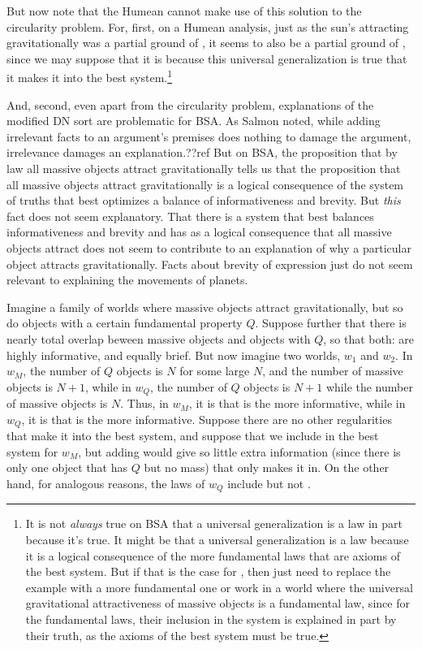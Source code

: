 But now note that the Humean cannot make use of this solution to the circularity problem. For, first, on a Humean analysis, just as 
the sun's attracting gravitationally was a partial ground of , it seems to also be a partial ground of , 
since we may suppose that it is because this universal generalization is true that it makes it into the best 
system.\footnote{It is not \textit{always} true on BSA that a universal generalization is a law in part because it's true. 
It might be that a universal generalization is a law because it is a logical consequence of the more fundamental laws that are axioms of the 
best system. But if that is the case for , then just need to replace the example with a more fundamental one or work 
in a world where the universal gravitational attractiveness of massive objects is a fundamental law, since for the 
fundamental laws, their inclusion in the system is explained in part by their truth, as the axioms of the best system must
be true.} 

And, second, even apart from the circularity problem, explanations of the modified DN sort are problematic for BSA.
As Salmon noted, while adding irrelevant facts to an argument's premises does nothing to damage the argument, irrelevance
damages an explanation.??ref But on BSA, the proposition that by law all massive objects attract gravitationally tells us
that the proposition that all massive objects attract gravitationally is a logical consequence of the system
of truths that best optimizes a balance of informativeness and brevity. But \textit{this} fact does not seem explanatory.
That there is a system that best balances informativeness and brevity and has as a logical consequence that all massive
objects attract does not seem to contribute to an explanation of why a particular object attracts gravitationally. Facts 
about brevity of expression just do not seem relevant to explaining the movements of planets. 

Imagine a family of worlds where massive objects attract gravitationally, but so do objects with a certain fundamental property $Q$. 
Suppose further that there is nearly total overlap beween massive objects and objects with $Q$, so that both:
are highly informative, and equally brief. But now imagine two worlds, $w_1$ and $w_2$. In $w_M$, the number of $Q$
objects is $N$ for some large $N$, and the number of massive objects is $N+1$, while in $w_Q$, the number of $Q$ objects
is $N+1$ while the number of massive objects is $N$. Thus, in $w_M$, it is  that is the more informative,
while in $w_Q$, it is  that is the more informative. Suppose there are no other regularities that make it
into the best system, and suppose that we include  in the best system for $w_M$, but adding 
would give so little extra information (since there is only one object that has $Q$ but no mass) that only  makes 
it in. On the other hand, for analogous reasons, the laws of $w_Q$ include  but not . 

